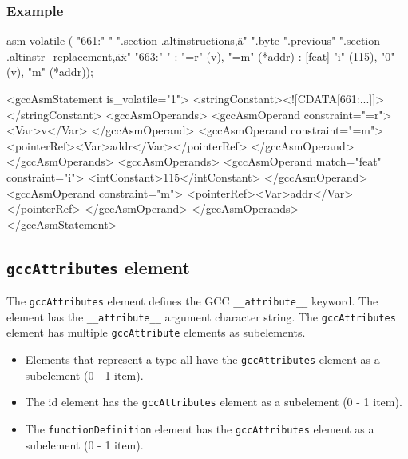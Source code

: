 {\subsubsection*{Example}
\vspace{2mm}

\begin{CExample}
  asm volatile (
       "661:\n"
       "\tmovl %
       ".section .altinstructions,\"a\"\n"
       ".byte %
       ".previous\n"
       ".section .altinstr_replacement,\"ax\"\n"
       "663:\n"
       "\txchgl %
       : "=r" (v), "=m" (*addr)
       : [feat] "i" (115), "0" (v), "m" (*addr));
\end{CExample}
\vspace{1mm}

\begin{XcodeMLExample}
   <gccAsmStatement is_volatile="1">
     <stringConstant><![CDATA[661:\n\tmovl ...]]></stringConstant>
     <gccAsmOperands>
       <gccAsmOperand constraint="=r">
         <Var>v</Var>
       </gccAsmOperand>
       <gccAsmOperand constraint="=m">
         <pointerRef><Var>addr</Var></pointerRef>
       </gccAsmOperand>
     </gccAsmOperands>
     <gccAsmOperands>
       <gccAsmOperand match="feat" constraint="i">
         <intConstant>115</intConstant>
       </gccAsmOperand>
       <gccAsmOperand constraint="m">
         <pointerRef><Var>addr</Var></pointerRef>
       </gccAsmOperand>
     </gccAsmOperands>
   </gccAsmStatement>
\end{XcodeMLExample}


\subsection{ {\tt gccAttributes} element}

The {\tt gccAttributes} element defines the GCC {\tt \_\_attribute\_\_} keyword. The element has the {\tt \_\_attribute\_\_} argument character string. The {\tt gccAttributes} element has multiple {\tt gccAttribute} elements as subelements.

\begin{itemize}
\item Elements that represent a type all have the {\tt gccAttributes} element as a subelement (0 - 1 item).
\item The id element has the {\tt gccAttributes} element as a subelement (0 - 1 item).
\item The {\tt functionDefinition} element has the {\tt gccAttributes} element as a subelement (0 - 1 item).
\end{itemize}

}
